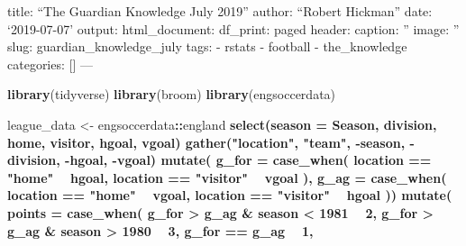 \documentclass[]{article}
\title{}
\author{}
\date{}
\newenvironment{Shaded}{\begin{snugshade}}{\end{snugshade}}
\newcommand{\DataTypeTok}[1]{\textcolor[rgb]{0.13,0.29,0.53}{#1}}
\newcommand{\DecValTok}[1]{\textcolor[rgb]{0.00,0.00,0.81}{#1}}
\newcommand{\KeywordTok}[1]{\textcolor[rgb]{0.13,0.29,0.53}{\textbf{#1}}}
\newcommand{\NormalTok}[1]{#1}
\newcommand{\OperatorTok}[1]{\textcolor[rgb]{0.81,0.36,0.00}{\textbf{#1}}}
\newcommand{\StringTok}[1]{\textcolor[rgb]{0.31,0.60,0.02}{#1}}
\begin{document}
title: ``The Guardian Knowledge July 2019'' author: ``Robert Hickman''
date: `2019-07-07' output: html\_document: df\_print: paged header:
caption: '' image: '' slug: guardian\_knowledge\_july tags: - rstats -
football - the\_knowledge categories: {[}{]} ---

\begin{Shaded}
\begin{Highlighting}[]
\KeywordTok{library}\NormalTok{(tidyverse)}
\KeywordTok{library}\NormalTok{(broom)}
\KeywordTok{library}\NormalTok{(engsoccerdata)}
\end{Highlighting}
\end{Shaded}

\begin{Shaded}
\begin{Highlighting}[]
\NormalTok{league_data <-}\StringTok{ }\NormalTok{engsoccerdata}\OperatorTok{::}\NormalTok{england }\OperatorTok{%>%}
\StringTok{  }\KeywordTok{select}\NormalTok{(}\DataTypeTok{season =}\NormalTok{ Season, division, home, visitor, hgoal, vgoal) }\OperatorTok{%>%}
\StringTok{  }\KeywordTok{gather}\NormalTok{(}\StringTok{"location"}\NormalTok{, }\StringTok{"team"}\NormalTok{, }\OperatorTok{-}\NormalTok{season, }\OperatorTok{-}\NormalTok{division, }\OperatorTok{-}\NormalTok{hgoal, }\OperatorTok{-}\NormalTok{vgoal) }\OperatorTok{%>%}
\StringTok{  }\KeywordTok{mutate}\NormalTok{(}
    \DataTypeTok{g_for =} \KeywordTok{case_when}\NormalTok{(}
\NormalTok{      location }\OperatorTok{==}\StringTok{ "home"} \OperatorTok{~}\StringTok{ }\NormalTok{hgoal,}
\NormalTok{      location }\OperatorTok{==}\StringTok{ "visitor"} \OperatorTok{~}\StringTok{ }\NormalTok{vgoal}
\NormalTok{    ),}
    \DataTypeTok{g_ag =} \KeywordTok{case_when}\NormalTok{(}
\NormalTok{      location }\OperatorTok{==}\StringTok{ "home"} \OperatorTok{~}\StringTok{ }\NormalTok{vgoal,}
\NormalTok{      location }\OperatorTok{==}\StringTok{ "visitor"} \OperatorTok{~}\StringTok{ }\NormalTok{hgoal}
\NormalTok{    )) }\OperatorTok{%>%}
\StringTok{  }\KeywordTok{mutate}\NormalTok{(}
    \DataTypeTok{points =} \KeywordTok{case_when}\NormalTok{(}
\NormalTok{      g_for }\OperatorTok{>}\StringTok{ }\NormalTok{g_ag }\OperatorTok{&}\StringTok{ }\NormalTok{season }\OperatorTok{<}\StringTok{ }\DecValTok{1981} \OperatorTok{~}\StringTok{ }\DecValTok{2}\NormalTok{,}
\NormalTok{      g_for }\OperatorTok{>}\StringTok{ }\NormalTok{g_ag }\OperatorTok{&}\StringTok{ }\NormalTok{season }\OperatorTok{>}\StringTok{ }\DecValTok{1980} \OperatorTok{~}\StringTok{ }\DecValTok{3}\NormalTok{,}
\NormalTok{      g_for }\OperatorTok{==}\StringTok{ }\NormalTok{g_ag }\OperatorTok{~}\StringTok{ }\DecValTok{1}\NormalTok{,}
}}}}
\end{Highlighting}
\end{Shaded}
\end{document}

